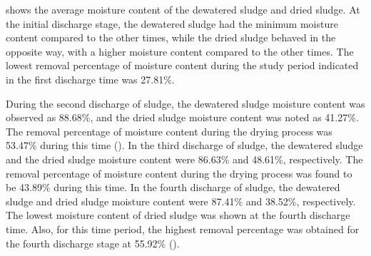 

 shows the average moisture content of the dewatered sludge and dried sludge. At the initial discharge stage, the dewatered sludge had the minimum moisture content compared to the other times, while the dried sludge behaved in the opposite way, with a higher moisture content compared to the other times. The lowest removal percentage of moisture content during the study period indicated in the first discharge time was 27.81\%.

During the second discharge of sludge, the dewatered sludge moisture content was observed as 88.68\%, and the dried sludge moisture content was noted as 41.27\%. The removal percentage of moisture content during the drying process was 53.47\% during this time (). In the third discharge of sludge, the dewatered sludge and the dried sludge moisture content were 86.63\% and 48.61\%, respectively. The removal percentage of moisture content during the drying process was found to be 43.89\% during this time. In the fourth discharge of sludge, the dewatered sludge and dried sludge moisture content were 87.41\% and 38.52\%, respectively. The lowest moisture content of dried sludge was shown at the fourth discharge time. Also, for this time period, the highest removal percentage was obtained for the fourth discharge stage at 55.92\% ().


